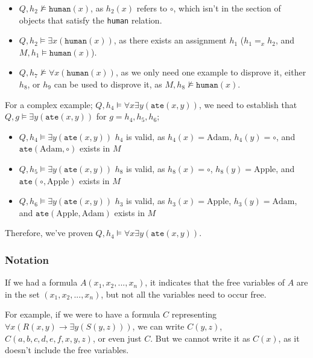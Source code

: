 \documentclass[a4paper, 12pt]{article}
\begin{document}
                \begin{itemize}
                    \itemsep0em
                    \item $Q, h_2 \nvDash \texttt{human}(x)$, as $h_2(x)$ refers to $\circ$, which isn't in the section of objects that satisfy the \texttt{human} relation.
                    \item $Q, h_2 \vDash \exists x (\texttt{human}(x))$, as there exists an assignment $h_1$ ($h_1 =_x h_2$, and $M, h_1 \vDash \texttt{human}(x)$).
                    \item $Q, h_7 \nvDash \forall x (\texttt{human}(x))$, as we only need one example to disprove it, either $h_8$, or $h_9$ can be used to disprove it, as $M, h_8 \nvDash \texttt{human}(x)$.
                \end{itemize}
                For a complex example; $Q, h_4 \vDash \forall x \exists y (\texttt{ate}(x, y))$, we need to establish that $Q, g \vDash \exists y (\texttt{ate}(x, y))$ for $g = h_4, h_5, h_6$;
                \begin{itemize}
                    \itemsep0em
                    \item $Q, h_4 \vDash \exists y (\texttt{ate}(x, y))$
                        \subitem $h_4$ is valid, as $h_4(x) = \text{Adam}$, $h_4(y) = \circ$, and $\texttt{ate}(\text{Adam}, \circ)$ exists in $M$
                    \item $Q, h_5 \vDash \exists y (\texttt{ate}(x, y))$
                        \subitem $h_8$ is valid, as $h_8(x) = \circ$, $h_8(y) = \text{Apple}$, and $\texttt{ate}(\circ, \text{Apple})$ exists in $M$
                    \item $Q, h_6 \vDash \exists y (\texttt{ate}(x, y))$
                        \subitem $h_3$ is valid, as $h_3(x) = \text{Apple}$, $h_3(y) = \text{Adam}$, and $\texttt{ate}(\text{Apple}, \text{Adam})$ exists in $M$
                \end{itemize}
                Therefore, we've proven $Q, h_4 \vDash \forall x \exists y (\texttt{ate}(x, y))$.
            \subsubsection*{Notation}
                If we had a formula $A(x_1, x_2, ..., x_n)$, it indicates that the free variables of $A$ are in the set $(x_1, x_2, ..., x_n)$, but not all the variables need to occur free.
                \medskip

                For example, if we were to have a formula $C$ representing $\forall x (R(x, y) \rightarrow \exists y (S(y, z)))$, we can write $C(y, z)$, $C(a, b, c, d, e, f, x, y, z)$, or even just $C$. But we cannot write it as $C(x)$, as it doesn't include the free variables.
                \medskip
\end{document}
